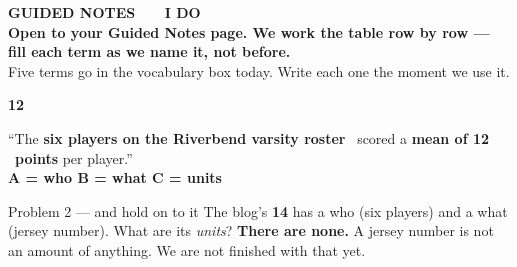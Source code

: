 \documentclass[aspectratio=169, 11pt]{beamer}
\newcommand{\redink}[1]{{\color{redacc}\bfseries #1}}
\begin{document}
{
\begin{frame}[plain]
  \vspace{1.8cm}\hspace{0.8cm}%
  \begin{minipage}{0.86\textwidth}
    {\color{goldacc}\bfseries\small GUIDED NOTES \ \textbullet\ \ I DO}\\[0.7cm]
    {\color{white}\bfseries\Large Open to your Guided Notes page. We work the table row by
    row --- fill each term as we name it, not before.}\\[0.9cm]
    {\color{frostmid}\small Five terms go in the vocabulary box today. Write each one the
    moment we use it.}
  \end{minipage}
\end{frame}
}

\begin{frame}[t, plain]
  \vspace{4pt}
  \begin{center}
    {\Large\bfseries 12} 
  \end{center}
  \vspace{6pt}
  \begin{center}
    {\large ``The \textbf{six players on the Riverbend varsity roster} \ scored a
    \textbf{mean of 12} \ \textbf{points} per player.''}\\[6pt]
    {\small\color{cerulean}\bfseries A = who \qquad B = what \qquad C = units}
  \end{center}
  \vspace{8pt}
  \begin{block}{Problem 2 --- and hold on to it}
    The blog's \textbf{14} has a who (six players) and a what (jersey number). What are its
    \emph{units}? \redink{There are none.} A jersey number is not an amount of anything.
    We are not finished with that yet.
  \end{block}
\end{frame}
\end{document}
